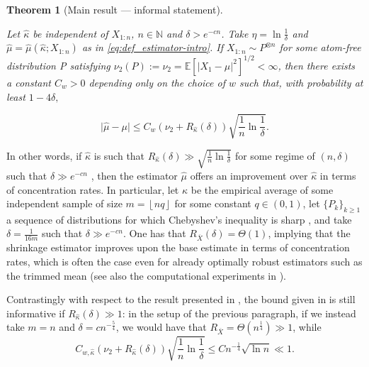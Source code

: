\documentclass{article}
\theoremstyle{plain}
\newtheorem{theorem}{Theorem}[section]
\theoremstyle{definition}
\def\N{\mathbb{N}} %
\begin{document}
\begin{theorem}[Main result --- informal statement]\label{thm:main_informal}

  Let $\widehat{\kappa}$ be independent of $X_{1:n}$, $n \in \N$ and $\delta > e^{-cn}$. Take \( \eta=\ln \frac{1}{\delta } \) and \( \widehat{\mu }=\widehat{\mu }(\widehat{\kappa };X_{1:n} )   \) as in \eqref{eq:def_estimator-intro}. If $X_{1:n} \sim P^{\otimes n}$ for some atom-free distribution P satisfying $\nu_2(P) := \nu_2 = \mathbb{E}\left[\lvert X_1-\mu  \rvert^2 \right]^{1/2} < \infty$, then there exists a constant $C_{w}>0 $ depending only on the choice of $w$ such that, with probability at least \( 1 -4\delta , \) 

    \begin{equation}\label{eq:bound_simple_intro}
    \lvert \widehat{\mu }-\mu   \rvert \le  C_{w}  (\nu_2 + R_{\widehat{\kappa } }(\delta))\sqrt{ \frac{1}{n}\ln \frac{1}{\delta }}.
  \end{equation}
\end{theorem}
In other words, if \( \widehat{\kappa }  \) is such that \( R_{\widehat{\kappa } }(\delta ) \gg \sqrt{ \frac{1}{n} \ln \frac{1}{\delta }}\) for some regime of \( (n,\delta ) \) such that \( \delta  \gg e^{-cn} \) , then the estimator \( \widehat{\mu }  \) offers an improvement over \( \widehat{\kappa }  \) in terms of concentration rates. In particular, let \( \widehat{\kappa } \) be the empirical average of some independent sample of size $m= \left\lfloor nq \right\rfloor$ for some constant \( q \in (0,1) \), let \( \{P_k\}_{k\ge 1}  \) a sequence of distributions for which Chebyshev's inequality is sharp \citep{catoni2012challenging}, and take \( \delta =\frac{1}{16m} \) such that \(\delta  \gg e^{-cn}  \). One has that \( R_{\overline{X}}(\delta) = \Theta(1) \), implying that the shrinkage estimator improves upon the base estimate in terms of concentration rates, which is often the case even for already optimally robust estimators such as the trimmed mean (see also the computational experiments in ).

Contrastingly with respect to the result presented in , the bound given in  is still informative if \( R_{\widehat{\kappa } }(\delta ) \gg 1\): in the setup of the previous paragraph, if we instead take $m=n$ and \( \delta =cn^{-\frac{5}{4}} \), we would have that \( R_{\overline{X}} = \Theta(n^{\frac{1}{4}}) \gg 1 \), while \[
  C_{w,\widehat{\kappa } }(\nu _2 +R_{\widehat{\kappa } }(\delta ))\sqrt{\frac{1}{n} \ln \frac{1}{\delta }} \le C n^{-\frac{1}{4}}\sqrt{\ln n} \ll 1.  
\] 
\end{document}
